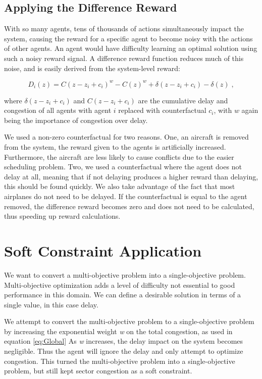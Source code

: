 \documentclass[onehalf,11pt]{beavtex}
\begin{document}
\subsection{Applying the Difference Reward}
With so many agents, tens of thousands of actions simultaneously impact the system, causing the reward for a specific agent to become noisy with the actions of other agents. An agent would have difficulty learning an optimal solution using such a noisy reward signal. A difference reward function reduces much of this noise, and is easily derived from the system-level reward:

\begin{equation}
D_i(z) = C(z-z_i + c_i)^w - C(z)^w + \delta(z-z_i + c_i) - \delta(z)\;,
\end{equation}

where \textit{$\delta(z-z_i + c_i)$} and \textit{$C(z-z_i + c_i)$} are the cumulative delay and congestion of all agents with agent $i$ replaced with counterfactual \textit{$c_i$}, with $w$ again being the importance of congestion over delay. 

We used a non-zero counterfactual for two reasons. One, an aircraft is removed from the system, the reward given to the agents is artificially increased. Furthermore, the aircraft are less likely to cause conflicts due to the easier scheduling problem. Two, we used a counterfactual where the agent does not delay at all, meaning that if not delaying produces a higher reward than delaying, this should be found quickly. We also take advantage of the fact that most airplanes do not need to be delayed. If the counterfactual is equal to the agent removed, the difference reward becomes zero and does not need to be calculated, thus speeding up reward calculations.

\section{Soft Constraint Application}
We want to convert a multi-objective problem into a single-objective problem. Multi-objective optimization adds a level of difficulty not essential to good performance in this domain. We can define a desirable solution in terms of a single value, in this case delay. 

We attempt to convert the multi-objective problem to a single-objective problem by increasing the exponential weight \textit{w} on the total congestion, as used in equation \ref{eq:Global} As \textit{w} increases, the delay impact on the system becomes negligible. Thus the agent will ignore the delay and only attempt to optimize congestion. This turned the multi-objective problem into a single-objective problem, but still kept sector congestion as a soft constraint.
\end{document}
